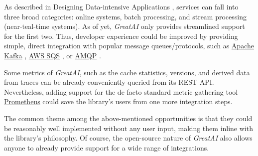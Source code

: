 As described in Designing Data-intensive Applications \cite{kleppmann2017designing}, services can fall into three broad categories: online systems, batch processing, and stream processing (near-teal-time systems). As of yet, \textit{GreatAI} only provides streamlined support for the first two. Thus, developer experience could be improved by providing simple, direct integration with popular message queues/protocols, such as \href{https://kafka.apache.org/}{Apache Kafka} \cite{kreps2011kafka}, \href{https://aws.amazon.com/sqs/}{AWS SQS} \cite{garfinkel2007evaluation}, or \href{https://www.amqp.org/}{AMQP} \cite{vinoski2006advanced}.

Some metrics of \textit{GreatAI}, such as the cache statistics, versions, and derived data from traces can be already conveniently queried from its REST API. Nevertheless, adding support for the de facto standard metric gathering tool \href{https://prometheus.io/}{Prometheus} could save the library's users from one more integration steps.

The common theme among the above-mentioned opportunities is that they could be reasonably well implemented without any user input, making them inline with the library's philosophy. Of course, the open-source nature of \textit{GreatAI} also allows anyone to already provide support for a wide range of integrations.

